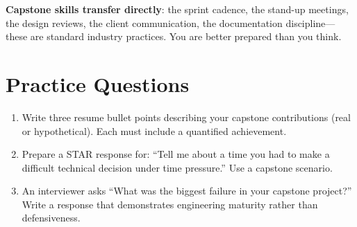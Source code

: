 \textbf{Capstone skills transfer directly}: the sprint cadence, the stand-up meetings, the design reviews, the client communication, the documentation discipline---these are standard industry practices. You are better prepared than you think.


\section{Practice Questions}
\begin{enumerate}[leftmargin=1.5em]
\item Write three resume bullet points describing your capstone contributions (real or hypothetical). Each must include a quantified achievement.
\item Prepare a STAR response for: ``Tell me about a time you had to make a difficult technical decision under time pressure.'' Use a capstone scenario.
\item An interviewer asks ``What was the biggest failure in your capstone project?'' Write a response that demonstrates engineering maturity rather than defensiveness.
\end{enumerate}


